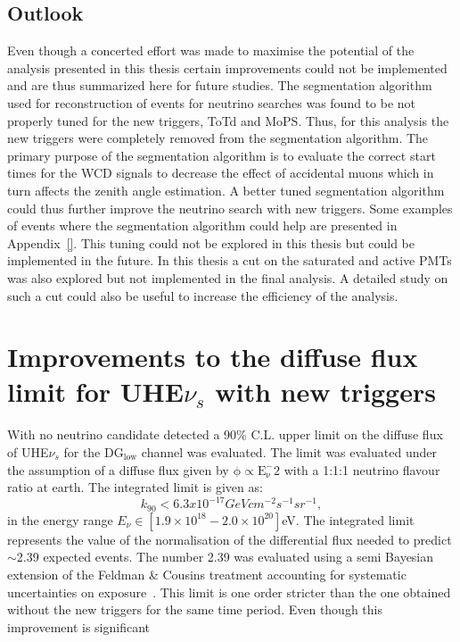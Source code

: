 \subsection*{Outlook}
Even though a concerted effort was made to maximise the potential of the analysis presented in this thesis certain improvements could not be implemented and are thus summarized here for future studies. The segmentation algorithm used for reconstruction of events for neutrino searches was found to be not properly tuned for the new triggers, ToTd and MoPS. Thus, for this analysis the new triggers were completely removed from the segmentation algorithm. The primary purpose of the segmentation algorithm is to evaluate the correct start times for the WCD signals to decrease the effect of accidental muons which in turn affects the zenith angle estimation. A better tuned segmentation algorithm could thus further improve the neutrino search with new triggers. Some examples of events where the segmentation algorithm could help are presented in Appendix~\ref{}. This tuning could not be explored in this thesis but could be implemented in the future. In this thesis a cut on the saturated and active PMTs was also explored but not implemented in the final analysis. A detailed study on such a cut could also be useful to increase the efficiency of the analysis.

\section*{Improvements to the diffuse flux limit for UHE$\nu_s$ with new triggers}
With no neutrino candidate detected a 90\% C.L. upper limit on the diffuse flux of UHE$\nu_s$ for the DG$\mathrm{_{low}}$ channel was evaluated. The limit was evaluated under the assumption of a diffuse flux given by $\mathrm{\phi \propto E_{\nu}^-2}$ with a 1:1:1 neutrino flavour ratio at earth. The integrated limit is given as:
\begin{equation}
    k_{90} < 6.3 x 10^{-17} GeV cm^{-2} s^{-1} sr^{-1},
\end{equation}
in the energy range $E_{\nu} \in [1.9 \times 10^{18} - 2.0 \times 10^{20}]$eV. The integrated limit represents the value of the normalisation of the differential flux needed to predict $\sim$2.39 expected events. The number 2.39 was evaluated using a semi Bayesian extension of the Feldman \& Cousins treatment accounting for systematic uncertainties on exposure~\cite{Conrad:2002kn}. This limit is one order stricter than the one obtained without the new triggers for the same time period. Even though this improvement is significant 
